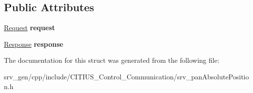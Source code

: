 \subsection*{\-Public \-Attributes}
\begin{DoxyCompactItemize}
\item 
\hypertarget{struct_c_i_t_i_u_s___control___communication_1_1srv__pan_absolute_position_a7b0bbcf76eced785625aab00b1411999}{\hyperlink{struct_c_i_t_i_u_s___control___communication_1_1srv__pan_absolute_position_request__}{\-Request} {\bfseries request}}\label{struct_c_i_t_i_u_s___control___communication_1_1srv__pan_absolute_position_a7b0bbcf76eced785625aab00b1411999}

\item 
\hypertarget{struct_c_i_t_i_u_s___control___communication_1_1srv__pan_absolute_position_af556f347ebc62b730e3f5a37e067051a}{\hyperlink{struct_c_i_t_i_u_s___control___communication_1_1srv__pan_absolute_position_response__}{\-Response} {\bfseries response}}\label{struct_c_i_t_i_u_s___control___communication_1_1srv__pan_absolute_position_af556f347ebc62b730e3f5a37e067051a}

\end{DoxyCompactItemize}


\-The documentation for this struct was generated from the following file\-:\begin{DoxyCompactItemize}
\item 
srv\-\_\-gen/cpp/include/\-C\-I\-T\-I\-U\-S\-\_\-\-Control\-\_\-\-Communication/srv\-\_\-pan\-Absolute\-Position.\-h\end{DoxyCompactItemize}
